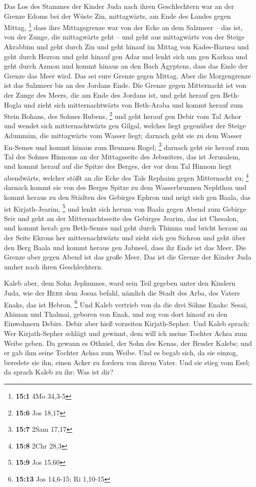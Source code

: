  Das Los des Stammes der Kinder Juda nach ihren
Geschlechtern war an der Grenze Edoms bei der Wüste Zin, mittagwärts, am
Ende des Landes gegen Mittag, \footnote{\textbf{15:1} 4Mo 34,3-5}
 dass ihre Mittagsgrenze war von der Ecke an dem Salzmeer
-- das ist, von der Zunge, die mittagwärts geht --  und
geht aus mittagwärts von der Steige Akrabbim und geht durch Zin und geht
hinauf im Mittag von Kades-Barnea und geht durch Hezron und geht hinauf
gen Adar und lenkt sich um gen Karkaa  und geht durch
Azmon und kommt hinaus an den Bach Ägyptens, dass das Ende der Grenze
das Meer wird. Das sei eure Grenze gegen Mittag.  Aber die
Morgengrenze ist das Salzmeer bis an des Jordans Ende. Die Grenze gegen
Mitternacht ist von der Zunge des Meers, die am Ende des Jordans ist,
 und geht herauf gen Beth-Hogla und zieht sich
mitternachtwärts von Beth-Araba und kommt herauf zum Stein Bohans, des
Sohnes Rubens, \footnote{\textbf{15:6} Jos 18,17}  und
geht herauf gen Debir vom Tal Achor und wendet sich mitternachtwärts gen
Gilgal, welches liegt gegenüber der Steige Adummim, die mittagwärts vom
Wasser liegt; darnach geht sie zu dem Wasser En-Semes und kommt hinaus
zum Brunnen Rogel; \footnote{\textbf{15:7} 2Sam 17,17} 
darnach geht sie herauf zum Tal des Sohnes Hinnoms an der Mittagsseite
des Jebusiters, das ist Jerusalem, und kommt herauf auf die Spitze des
Berges, der vor dem Tal Hinnom liegt abendwärts, welcher stößt an die
Ecke des Tals Rephaim gegen Mitternacht zu; \footnote{\textbf{15:8} 2Chr
  28,3}  darnach kommt sie von des Berges Spitze zu dem
Wasserbrunnen Nephthoa und kommt heraus zu den Städten des Gebirges
Ephron und neigt sich gen Baala, das ist Kirjath-Jearim, \footnote{\textbf{15:9}
  Jos 15,60}  und lenkt sich herum von Baala gegen Abend
zum Gebirge Seir und geht an der Mitternachtsseite des Gebirges Jearim,
das ist Chesalon, und kommt herab gen Beth-Semes und geht durch Thimna
 und bricht heraus an der Seite Ekrons her
mitternachtwärts und zieht sich gen Sichron und geht über den Berg Baala
und kommt heraus gen Jabneel, dass ihr Ende ist das Meer.
 Die Grenze aber gegen Abend ist das große Meer. Das ist
die Grenze der Kinder Juda umher nach ihren Geschlechtern.

 Kaleb aber, dem Sohn Jephunnes, ward sein Teil gegeben
unter den Kindern Juda, wie der \textsc{Herr} dem Josua befahl, nämlich
die Stadt des Arba, des Vaters Enaks, das ist Hebron. \footnote{\textbf{15:13}
  Jos 14,6-15; Ri 1,10-15}  Und Kaleb vertrieb von da die
drei Söhne Enaks: Sesai, Ahiman und Thalmai, geboren von Enak,
 und zog von dort hinauf zu den Einwohnern Debirs. Debir
aber hieß vorzeiten Kirjath-Sepher.  Und Kaleb sprach:
Wer Kirjath-Sepher schlägt und gewinnt, dem will ich meine Tochter Achsa
zum Weibe geben.  Da gewann es Othniel, der Sohn des
Kenas, der Bruder Kalebs; und er gab ihm seine Tochter Achsa zum Weibe.
 Und es begab sich, da sie einzog, beredete sie ihn,
einen Acker zu fordern von ihrem Vater. Und sie stieg vom Esel; da
sprach Kaleb zu ihr: Was ist dir?

